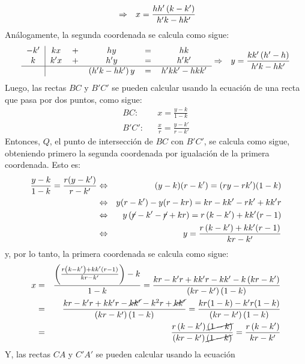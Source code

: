 \begin{solucion}
\begin{eqnarray*}
\begin{tabular}{c|ccccc}
  \end{tabular}
  & \Rightarrow &
  x = \frac{hh'\left( k-k' \right)}{h'k-hk'}
 \end{eqnarray*}
 An\'alogamente, la segunda coordenada se calcula como sigue:
 \begin{eqnarray*}
  \begin{tabular}{c|ccccc}
   $-k'$ & $kx$  & $+$ & $hy$  & $=$ & $hk$   \\
   $k$   & $k'x$ & $+$ & $h'y$ & $=$ & $h'k'$ \\
   \hline 
   & & & $\left( h'k-hk' \right)y$ & $=$ & $h'kk'-hkk'$
  \end{tabular}
  & \Rightarrow &
  y = \frac{kk'\left( h' - h \right)}{h'k-hk'}
 \end{eqnarray*}
 Luego, las rectas $BC$ y $B'C'$ se pueden calcular
 usando la ecuaci\'on de una recta que pasa por dos puntos, como sigue:
 \begin{eqnarray*}
  BC: & & x = \frac{y-k}{1-k} \\
  B'C': & & \frac{x}{r} = \frac{y-k'}{r-k'}
 \end{eqnarray*}
 Entonces, $Q$, el punto de intersecci\'on de $BC$ con $B'C'$,
 se calcula como sigue, obteniendo primero la segunda coordenada
 por igualaci\'on de la primera coordenada. Esto es:
 \begin{eqnarray*}
  \frac{y-k}{1-k} = \frac{r(y-k')}{r-k'} & \Leftrightarrow &
  (y-k)(r-k') = (ry-rk')(1-k) \\
  & \Leftrightarrow &
  y(r-k') - y(r-kr) = kr - kk' -rk' + kk'r \\
  & \Leftrightarrow &
  y\left( \cancel{r} - k'- \cancel{r} + kr\right) = 
  r\left(k-k'\right) + kk'(r-1) \\
  & \Leftrightarrow & y = \frac{r\left(k-k'\right) + kk'(r-1)}{kr-k'}
 \end{eqnarray*}
 y, por lo tanto, la primera coordenada se calcula como sigue:
 \begin{eqnarray*}
  x & = & 
  \frac{\left(\frac{r\left(k-k'\right)+kk'(r-1)}{kr-k'}\right) - k}{1-k} 
  = \frac{kr-k'r+kk'r-kk'-k\left( kr-k'\right)}{\left(kr-k'\right)(1-k)} \\
  & = &
  \frac{kr-k'r+kk'r-\cancel{kk'}-k^2r+\cancel{kk'}}{\left(kr-k'\right)(1-k)}
  = \frac{kr(1-k)-k'r(1-k)}{\left(kr-k'\right)(1-k)} \\
  & = & 
  \frac{r\left(k-k'\right)\cancel{(1-k)}}{\left(kr-k'\right)\cancel{(1-k)}}
  = \frac{r\left(k-k'\right)}{kr-k'}
 \end{eqnarray*}
 Y, las rectas $CA$ y $C'A'$ se pueden calcular usando la ecuaci\'on

\end{solucion}
